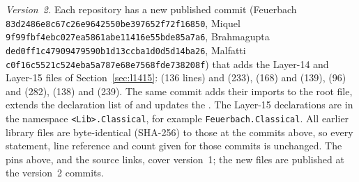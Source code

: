 \documentclass[11pt]{article}
\theoremstyle{definition}
\theoremstyle{remark}
\newcommand{\lean}[1]{\texttt{#1}}
\begin{document}
\emph{Version~2.} Each repository has a new published commit (Feuerbach \texttt{83d2486e8c67c26e9642550be397652f72f16850}, Miquel
\texttt{9f99fbf4ebc027ea5861abe11416e55bde85a7a6}, Brahmagupta \texttt{ded0ff1c47909479590b1d13ccba1d0d5d14ba26}, Malfatti \texttt{c0f16c5521c524eba5a787e68e7568fde738208f}) that adds the
Layer-14 and Layer-15 files of Section~\ref{sec:l1415}:  (136 lines) and
 (233),  (168) and
 (139),  (96) and
 (282),  (138) and
 (239). The same commit adds their imports to the root file, extends the
declaration list of  and updates the . The Layer-15 declarations are in the
namespace \lean{<Lib>.Classical}, for example \lean{Feuerbach.Classical}. All earlier library files are
byte-identical (SHA-256) to those at the commits above, so every statement, line reference and count
given for those commits is unchanged. The pins above, and the source links, cover version~1; the new files
are published at the version~2 commits.
\end{document}
